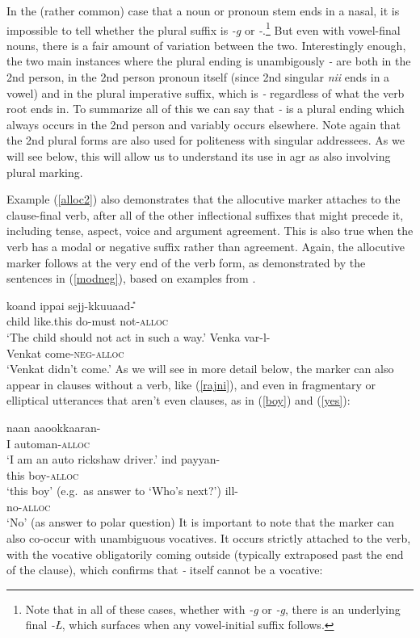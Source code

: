 \documentclass[output=paper, modfonts, nonflat]{langsci/langscibook}
\begin{document}
In the (rather common) case that a noun or pronoun stem ends in a
nasal, it is impossible to tell whether the plural suffix is
\textit{-g\A} or \textit{-\nga}.\footnote{Note that in all of these
  cases, whether with \textit{-g\A} or \textit{-\ng g\A}, there is an
  underlying final \textit{-\L}, which surfaces when any vowel-initial
  suffix follows.} But even with vowel-final nouns, there is a fair
amount of variation between the two. Interestingly enough, the two
main instances where the plural ending is unambigously \textit{-\nga}
are both in the 2nd person, in the 2nd person pronoun itself (since
2nd singular \textit{nii} ends in a vowel) and in the plural
imperative suffix, which is \textit{-\nga} regardless of what the verb
root ends in. To summarize all of this we can say that \textit{-\nga}
is a plural ending which always occurs in the 2nd person and variably
occurs elsewhere. Note again that the 2nd plural forms are also used
for politeness with singular addressees. As we will see below, this
will allow us to understand its use in agr{} as also involving
plural marking. 

Example (\ref{alloc2}) also demonstrates that the allocutive marker
attaches to the clause-final verb, after all of the other inflectional
suffixes that might precede it, including tense, aspect, voice and
argument agreement. This is also true when the verb has a modal or
negative suffix rather than agreement. Again, the allocutive marker
follows at the very end of the verb form, as demonstrated by the
sentences in (\ref{modneg}), based on examples from
\citet{amrit:1991}.

\ea\label{modneg}
 \ea\label{modal}\gll ko\Z and\AI{} ippa\D i sejj\A-kkuu\D aad\U-\nga\\ 
 child {like.this} do-{must not}-\textsc{alloc}\\
 \glt `The child should not act in such a way.'
 \ex\label{neg}\gll Venka\textrtailt{} var\A-l\A-\nga\\
 Venkat come-\textsc{neg}-\textsc{alloc}\\
 \glt `Venkat didn't come.'
 \z
\z
%
As we will see in more detail below, the marker can also appear in
clauses without a verb, like (\ref{rajni}), and even in fragmentary or
elliptical utterances that aren't even clauses, as in (\ref{boy}) and
(\ref{yes}):

\ea\label{short}
 \ea\label{rajni}\gll naan aa\textrtailt\textrtailt ookkaaran-\nga\\
 I automan-\textsc{alloc}\\
 \glt `I am an auto rickshaw driver.'
 \ex\label{boy}\gll ind\A{} payyan-\nga\\
 this boy-\textsc{alloc}\\
 \glt `this boy' (e.g.\ as answer to `Who's next?')
 \ex\label{yes}\gll ill\A-\nga\\
 no-\textsc{alloc}\\
 \glt `No' (as answer to polar question)
 \z
\z
%
It is important to note that the \allagr{} marker can also co-occur
with unambiguous vocatives. It occurs strictly attached to the verb,
with the vocative obligatorily coming outside (typically extraposed
past the end of the clause), which confirms that \textit{-\nga} itself
cannot be a vocative:
\end{document}

